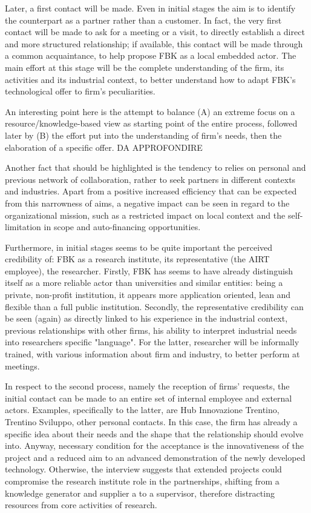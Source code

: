 Later, a first contact will be made. Even in initial stages the aim is to identify the counterpart as a partner rather than a customer. In fact, the very first contact will be made to ask for a meeting or a visit, to directly establish a direct and more structured relationship; if available, this contact will be made through a common acquaintance, to help propose FBK as a local embedded actor. The main effort at this stage will be the complete understanding of the firm, its activities and its industrial context, to better understand how to adapt FBK’s technological offer to firm’s peculiarities. 

An interesting point here is the attempt to balance (A) an extreme focus on a resource/knowledge-based view as starting point of the entire process, followed later by (B) the effort put into the understanding of firm’s needs, then the elaboration of a specific offer. DA APPROFONDIRE 

Another fact that should be highlighted is the tendency to relies on personal and previous network of collaboration, rather to seek partners in different contexts and industries. Apart from a positive increased efficiency that can be expected from this narrowness of aims, a negative impact can be seen in regard to the organizational mission, such as a restricted impact on local context and the self-limitation in scope and auto-financing opportunities.

Furthermore, in initial stages seems to be quite important the perceived credibility of: FBK as a research institute, its representative (the AIRT employee), the researcher. Firstly, FBK has seems to have already distinguish itself as a more reliable actor than universities and similar entities: being a private, non-profit institution, it appears more application oriented, lean and flexible than a full public institution. Secondly, the representative credibility can be seen (again) as directly linked to his experience in the industrial context, previous relationships with other firms, his ability to interpret industrial needs into researchers specific "language". For the latter, researcher will be informally trained, with various information about firm and industry, to better perform at meetings.

In respect to the second process, namely the reception of firms’ requests, the initial contact can be made to an entire set of internal employee and external actors. Examples, specifically to the latter, are Hub Innovazione Trentino, Trentino Sviluppo, other personal contacts. In this case, the firm has already a specific idea about their needs and the shape that the relationship should evolve into. Anyway, necessary condition for the acceptance is the innovativeness of the project and a reduced aim to an advanced demonstration of the newly developed technology. Otherwise, the interview suggests that extended projects could compromise the research institute role in the partnerships, shifting from a knowledge generator and supplier a to a supervisor, therefore distracting resources from core activities of research.

